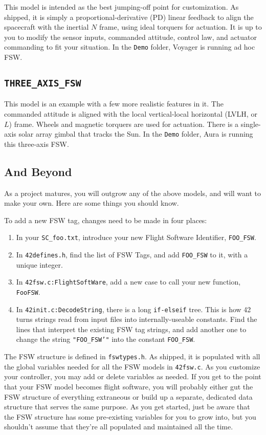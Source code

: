 \documentclass[12pt]{article}
\begin{document}
This model is intended as the best jumping-off point for customization.  As shipped, it is simply a proportional-derivative (PD) linear feedback to align the spacecraft with the inertial $N$ frame, using ideal torquers for actuation.  It is up to you to modify the sensor inputs, commanded attitude, control law, and actuator commanding to fit your situation.  In the {\tt Demo} folder, Voyager is running ad hoc FSW.

\subsection{\tt THREE\_AXIS\_FSW}

This model is an example with a few more realistic features in it.  The commanded attitude is aligned with the local vertical-local horizontal (LVLH, or $L$) frame.  Wheels and magnetic torquers are used for actuation.  There is a single-axis solar array gimbal that tracks the Sun.  In the {\tt Demo} folder, Aura is running this three-axis FSW.

\subsection{And Beyond}

As a project matures, you will outgrow any of the above models, and will want to make your own.  Here are some things you should know.

To add a new FSW tag, changes need to be made in four places:
\begin{enumerate}
\item In your {\tt SC\_foo.txt}, introduce your new Flight Software Identifier, {\tt FOO\_FSW}.
\item In {\tt 42defines.h}, find the list of FSW Tags, and add {\tt FOO\_FSW} to it, with a unique integer.
\item In {\tt 42fsw.c:FlightSoftWare}, add a new case to call your new function, {\tt FooFSW}.
\item In {\tt 42init.c:DecodeString}, there is a long {\tt if-elseif} tree.  This is how 42 turns strings read from input files into internally-useable constants.  Find the lines that interpret the existing FSW tag strings, and add another one to change the string {\tt "FOO\_FSW'"} into the constant {\tt FOO\_FSW}. 
\end{enumerate}

The FSW structure is defined in {\tt fswtypes.h}.  As shipped, it is populated with all the global variables needed for all the FSW models in {\tt 42fsw.c}.  As you customize your controller, you may add or delete variables as needed.  If you get to the point that your FSW model becomes flight software, you will probably either gut the FSW structure of everything extraneous or build up a separate, dedicated data structure that serves the same purpose.  As you get started, just be aware that the FSW structure has some pre-existing variables for you to grow into, but you shouldn't assume that they're all populated and maintained all the time.
\end{document}
